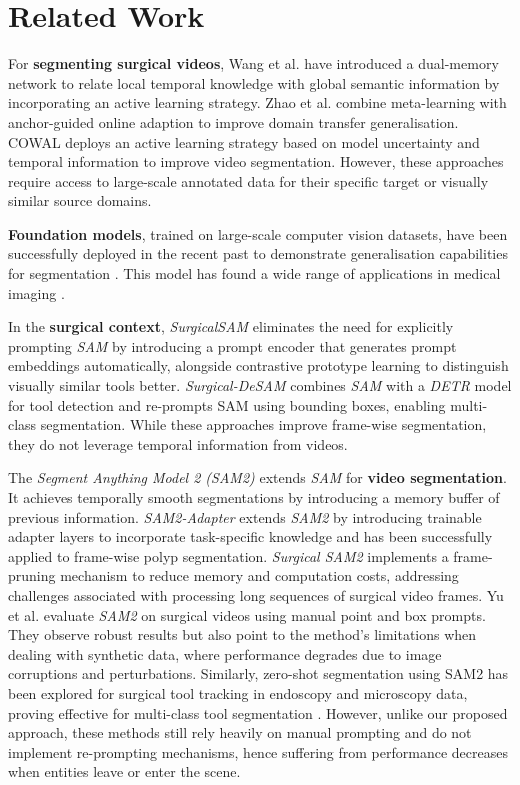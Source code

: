 \section{Related Work}
\label{sec:rw}

For \textbf{segmenting surgical videos}, Wang et al. \cite{wang2021efficient} have introduced a dual-memory network to relate local temporal knowledge with global semantic information by incorporating an active learning strategy. Zhao et al. \cite{zhao2021anchor} combine meta-learning with anchor-guided online adaption to improve domain transfer generalisation. COWAL \cite{wu2024correlation} deploys an active learning strategy based on model uncertainty and temporal information to improve video segmentation. However, these approaches require access to large-scale annotated data for their specific target or visually similar source domains.

\textbf{Foundation models}, trained on large-scale computer vision datasets, have been successfully deployed in the recent past to demonstrate generalisation capabilities for segmentation \cite{kirillov2023segment}. This model has found a wide range of applications in medical imaging \cite{ma2024segment,ranem2024uncle}.

In the \textbf{surgical context}, \emph{SurgicalSAM} \cite{yue2024surgicalsam} eliminates the need for explicitly prompting \emph{SAM}\cite{kirillov2023segment} by introducing a prompt encoder that generates prompt embeddings automatically, alongside contrastive prototype learning to distinguish visually similar tools better. \emph{Surgical-DeSAM} \cite{sheng2024surgical} combines \emph{SAM} with a \emph{DETR} model for tool detection and re-prompts SAM using bounding boxes, enabling multi-class segmentation. While these approaches improve frame-wise segmentation, they do not leverage temporal information from videos.

The \emph{Segment Anything Model 2 (SAM2)} \cite{ravi2024sam} extends \emph{SAM} \cite{kirillov2023segment} for \textbf{video segmentation}. It achieves temporally smooth segmentations by introducing a memory buffer of previous information. \emph{SAM2-Adapter} \cite{chen2024sam2} extends \emph{SAM2} by introducing trainable adapter layers to incorporate task-specific knowledge and has been successfully applied to frame-wise polyp segmentation. \emph{Surgical SAM2} \cite{liu2024surgical} implements a frame-pruning mechanism to reduce memory and computation costs, addressing challenges associated with processing long sequences of surgical video frames. Yu et al. \cite{yu2024sam} evaluate \emph{SAM2} on surgical videos using manual point and box prompts. They observe robust results but also point to the method's limitations when dealing with synthetic data, where performance degrades due to image corruptions and perturbations. Similarly, zero-shot segmentation using SAM2 has been explored for surgical tool tracking in endoscopy and microscopy data, proving effective for multi-class tool segmentation \cite{lou2024zero}. However, unlike our proposed approach, these methods still rely heavily on manual prompting and do not implement re-prompting mechanisms, hence suffering from performance decreases when entities leave or enter the scene.
